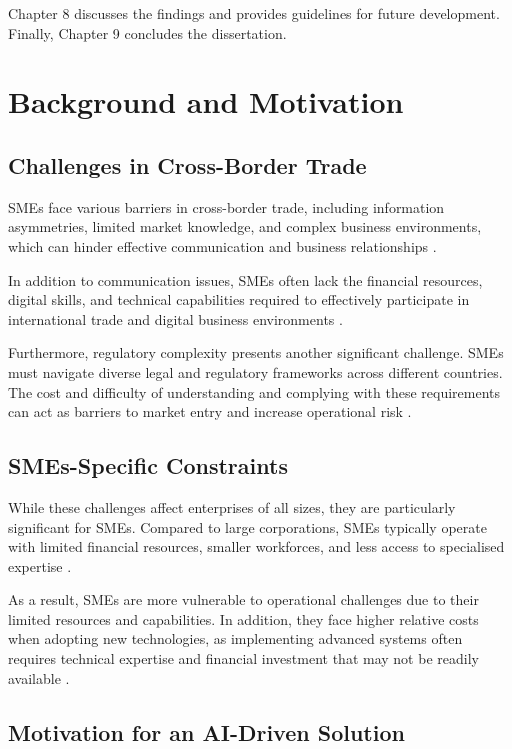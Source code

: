 \documentclass[12pt,a4paper]{report}
\begin{document}
Chapter 8 discusses the findings and provides guidelines for future development. Finally, Chapter 9 concludes the dissertation.


\chapter{Background and Motivation}

\section{Challenges in Cross-Border Trade}

SMEs face various barriers in cross-border trade, including information asymmetries, limited market knowledge, and complex business environments, which can hinder effective communication and business relationships \citep{itc2021}.

In addition to communication issues, SMEs often lack the financial resources, digital skills, and technical capabilities required to effectively participate in international trade and digital business environments \citep{unctad2021}.

Furthermore, regulatory complexity presents another significant challenge. SMEs must navigate diverse legal and regulatory frameworks across different countries. The cost and difficulty of understanding and complying with these requirements can act as barriers to market entry and increase operational risk \citep{wto2016,oecd2021}.

\section{SMEs-Specific Constraints}

While these challenges affect enterprises of all sizes, they are particularly significant for SMEs. Compared to large corporations, SMEs typically operate with limited financial resources, smaller workforces, and less access to specialised expertise \citep{oecd2021}.

As a result, SMEs are more vulnerable to operational challenges due to their limited resources and capabilities. In addition, they face higher relative costs when adopting new technologies, as implementing advanced systems often requires technical expertise and financial investment that may not be readily available \citep{oecd2021,mckinsey2023}.

\section{Motivation for an AI-Driven Solution}
\end{document}
